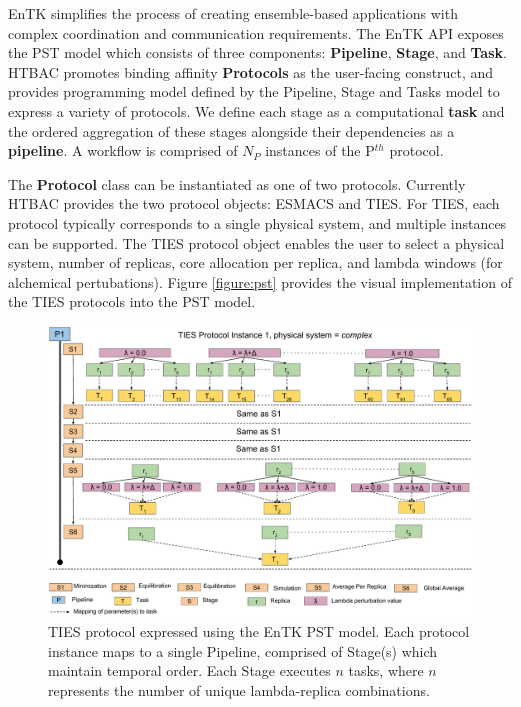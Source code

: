 
EnTK simplifies the process of creating ensemble-based applications with
complex coordination and communication requirements. The EnTK API exposes the
PST model which consists of three components: \textbf{Pipeline},
\textbf{Stage}, and \textbf{Task}. HTBAC promotes binding affinity  {\bf
Protocols} as the user-facing construct, and provides programming model
defined by the Pipeline, Stage and Tasks model to express a variety of
protocols. We define each stage as a computational \textbf{task} and the
ordered aggregation of these stages alongside their dependencies as a
\textbf{pipeline}. A workflow is comprised of $N_P$ instances of the P$^{th}$
protocol.

The \textbf{Protocol} class can be instantiated as one of two protocols.
Currently HTBAC provides the two protocol objects: ESMACS and TIES. For
TIES, each protocol typically corresponds to a single physical system, and
multiple instances can be supported. The TIES protocol object enables the user
to select a physical system, number of replicas, core allocation per replica,
and lambda windows (for alchemical pertubations). Figure \ref{figure:pst}
provides the visual implementation of the TIES protocols into the PST model.



\begin{figure}
  \centering
   \includegraphics[width=\columnwidth]{figures/_TIES_EnTK_implementation.pdf}
  \caption{TIES protocol expressed using the EnTK PST model. Each protocol 
  instance maps to a single Pipeline, comprised of Stage(s) which maintain 
  temporal order. Each Stage executes $n$ tasks, where $n$ represents the 
  number of unique lambda-replica combinations.}
\label{fig:pst}
\end{figure}

